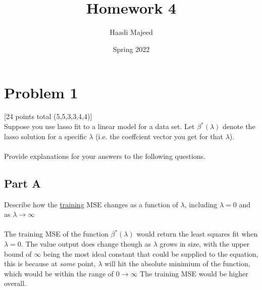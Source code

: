 \documentclass[12pt]{article}
\title{ \course \\\large Homework 4 }
\author{ Haadi Majeed }
\date{Spring 2022}
\begin{document}
\maketitle
\pagebreak

\pagebreak
\section{Problem 1}
 [24 points total (5,5,3,3,4,4)]\\
Suppose you use lasso fit to a linear model for a data set. Let $\beta^*(\lambda)$ denote the lasso solution for a specific $\lambda$ (i.e. the coeffcient vector you get for that $\lambda$).
\\\\Provide explanations for your answers to the following questions.

\subsection{Part A}
Describe how the \underline{training} MSE changes as a function of $\lambda$, including $\lambda = 0$ and as $\lambda \rightarrow \infty$\\\\
The training MSE of the function $\beta^*(\lambda)$ would return the least squares fit when $\lambda = 0$. The value output does change though as $\lambda$ grows in size, with the upper bound of $\infty$ being the most ideal constant that could be supplied to the equation, this is because at \emph{some} point, $\lambda$ will hit the absolute minimium of the function, which would be within the range of $0\rightarrow\infty$ The training MSE would be higher overall.
\end{document}
